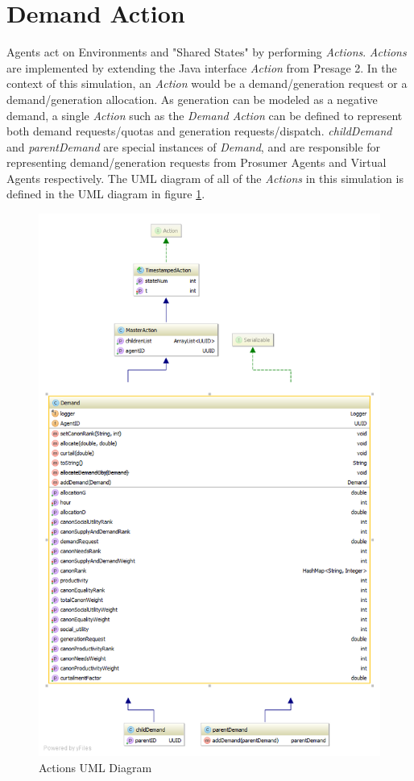 \clearpage

\section*{Demand Action}
Agents act on Environments and "Shared States" by performing \textit{Actions}. \textit{Actions} are implemented by extending the Java interface \textit{Action} from Presage 2. In the context of this simulation, an \textit{Action} would be a demand/generation request or a demand/generation allocation. As generation can be modeled as a negative demand, a single \textit{Action} such as the \textit{Demand Action} can be defined to represent both demand requests/quotas and generation requests/dispatch. \textit{childDemand} and \textit{parentDemand} are special instances of \textit{Demand}, and are responsible for representing demand/generation requests from Prosumer Agents and Virtual Agents respectively. The UML diagram of all of the \textit{Actions} in this simulation is defined in the UML diagram in figure \ref{fig:ActionUML}.

\begin{figure}[!h]
	\centering
	\includegraphics[scale=0.5]{Images/ActionUML.png}
	\caption{Actions UML Diagram}
	\label{fig:ActionUML}
\end{figure}

